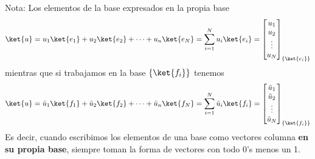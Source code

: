\documentclass[a4paper,11pt]{book} %
\numberwithin{equation}{chapter}
\begin{document}
\begin{mybox_blue}{Nota: Los elementos de la base expresados en la propia base}
	\begin{equation*}
	\ket{u} = u_1 \ket{e_1} + u_2 \ket{e_2} + \dots + u_n \ket{e_N} = \sum_{i=1}^{N} u_i \ket{e_i} = 
	\begin{bmatrix}
	u_1 \\ u_2\\ \vdots \\ u_N
	\end{bmatrix}_{\{\ket{e_i}\}}
	\end{equation*}
mientras que si trabajamos en la base $\{\ket{f_i}\}$ tenemos
	\begin{equation*}
	\ket{u} = \tilde{u}_1 \ket{f_1} + \tilde{u}_2 \ket{f_2} + \dots + \tilde{u}_n \ket{f_N} = \sum_{i=1}^{N} \tilde{u}_i \ket{f_i} = 
	\begin{bmatrix}
	\tilde{u}_1 \\ \tilde{u}_2\\ \vdots \\ \tilde{u}_N
	\end{bmatrix}_{\{\ket{f_i}\}}
	\end{equation*}
	Es decir, cuando escribimos los elementos de una base como vectores columna \textbf{en su propia base}, siempre toman la forma de vectores con todo 0's menos un 1.
	\end{mybox_blue}
\end{document}
